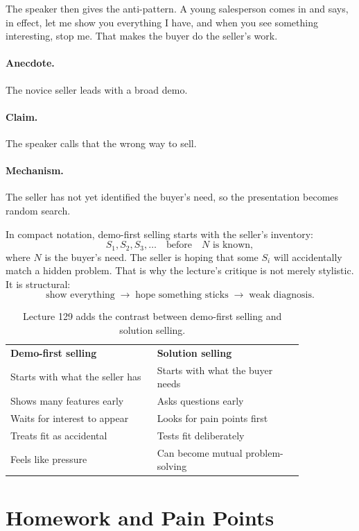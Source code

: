 \documentclass[11pt,oneside]{book}
\begin{document}
The speaker then gives the anti-pattern. A young salesperson comes in and says, in effect, let me show you everything I have, and when you see something interesting, stop me. That makes the buyer do the seller's work.

\paragraph{Anecdote.}
The novice seller leads with a broad demo.

\paragraph{Claim.}
The speaker calls that the wrong way to sell.

\paragraph{Mechanism.}
The seller has not yet identified the buyer's need, so the presentation becomes random search.

In compact notation, demo-first selling starts with the seller's inventory:
\[
S_1,S_2,S_3,\ldots
\quad\text{before}\quad
N \text{ is known},
\]
where \(N\) is the buyer's need. The seller is hoping that some \(S_i\) will accidentally match a hidden problem. That is why the lecture's critique is not merely stylistic. It is structural:
\[
\text{show everything}
\;\longrightarrow\;
\text{hope something sticks}
\;\longrightarrow\;
\text{weak diagnosis}.
\]

\begin{table}
\centering
\begin{tabular}{p{0.42\linewidth}p{0.42\linewidth}}
\textbf{Demo-first selling} & \textbf{Solution selling} \\
Starts with what the seller has & Starts with what the buyer needs \\
Shows many features early & Asks questions early \\
Waits for interest to appear & Looks for pain points first \\
Treats fit as accidental & Tests fit deliberately \\
Feels like pressure & Can become mutual problem-solving \\
\end{tabular}
\caption{Lecture 129 adds the contrast between demo-first selling and solution selling.}
\end{table}

\section{Homework and Pain Points}
\end{document}
